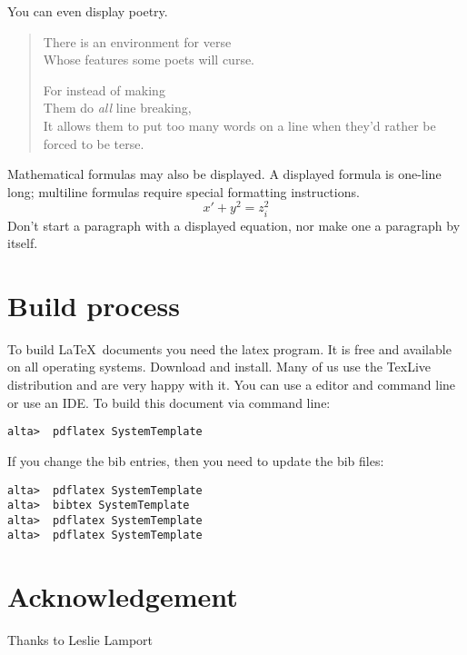 You can even display poetry.
\begin{verse}
   There is an environment for verse \\    %
   Whose features some poets will curse.   %


   For instead of making\\
   Them do {\em all\/} line breaking, \\
   It allows them to put too many words on a line when they'd 
   rather be forced to be terse.
\end{verse}

Mathematical formulas may also be displayed.  A displayed formula is
one-line long; multiline formulas require special formatting
instructions.
   \[  x' + y^{2} = z_{i}^{2}\]
Don't start a paragraph with a displayed equation, nor make
one a paragraph by itself.

\section{Build process}

To build \LaTeX\ documents you need the latex program.  It is free and available on all operating systems.   Download and install.  Many of us use the TexLive distribution and are very happy with it.    You can use a editor and command line or use an IDE.  To build this document via command line:

\begin{verbatim}
alta>  pdflatex SystemTemplate
\end{verbatim}
If you change the bib entries, then you need to update the bib files:
\begin{verbatim}
alta>  pdflatex SystemTemplate
alta>  bibtex SystemTemplate
alta>  pdflatex SystemTemplate
alta>  pdflatex SystemTemplate
\end{verbatim}


\section*{Acknowledgement}
Thanks to Leslie Lamport


